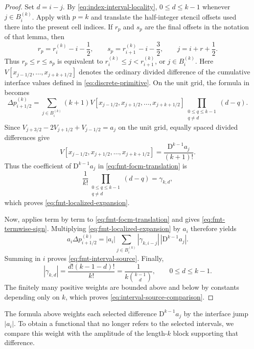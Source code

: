 \documentclass[11pt]{amsart}
\theoremstyle{plain}
\theoremstyle{definition}
\theoremstyle{remark}
\numberwithin{equation}{section}
\theoremstyle{plain}
\begin{document}
\begin{proof}
	Set $d=i-j$.  By \eqref{eq:index-interval-locality}, $0\le d\le k-1$
	whenever $j\in B_i^{(k)}$.  Apply \cite[Lemma~2.1]{FMT} with $p=k$ and
	translate the half-integer stencil offsets used there into the present
	cell indices.  If $r_p$ and $s_p$ are the final offsets in the notation of that
	lemma, then
	\[
		r_p=r_i^{(k)}-i-\frac12,
		\qquad
		s_p=r_{i+1}^{(k)}-i-\frac32,
		\qquad
		j=i+r+\frac12.
	\]
	Thus $r_p\le r\le s_p$ is equivalent to
	$r_i^{(k)}\le j<r_{i+1}^{(k)}$, or $j\in B_i^{(k)}$.  Here
	$V[x_{j-1/2},\ldots,x_{j+k+1/2}]$ denotes the ordinary divided difference
	of the cumulative interface values defined in \eqref{eq:discrete-primitive}.
	On the unit grid, the formula in \cite[Lemma~2.1]{FMT} becomes
	\begin{equation}\label{eq:fmt-focm-translation}
		\Delta p_{i+1/2}^{(k)}
		=
		\sum_{j\in B_i^{(k)}}
		(k+1)
		V[x_{j-1/2},x_{j+1/2},\ldots,x_{j+k+1/2}]
		\prod_{\substack{0\le q\le k-1\\q\ne d}}(d-q).
	\end{equation}
	Since
	$V_{j+3/2}-2V_{j+1/2}+V_{j-1/2}=a_j$ on the unit grid, equally spaced
	divided differences give
	\[
	V[x_{j-1/2},x_{j+1/2},\ldots,x_{j+k+1/2}]
	=\frac{\mathrm D^{k-1}a_j}{(k+1)!}.
	\]
	Thus the coefficient of $\mathrm D^{k-1}a_j$ in
	\eqref{eq:fmt-focm-translation} is
	\[
		\frac1{k!}\prod_{\substack{0\le q\le k-1\\q\ne d}}(d-q)
		=\gamma_{k,d},
	\]
	which proves \eqref{eq:fmt-localized-expansion}.

	Now, \cite[Lemma~2.2]{FMT} applies term by term to
	\eqref{eq:fmt-focm-translation} and gives
	\eqref{eq:fmt-termwise-sign}.  Multiplying
	\eqref{eq:fmt-localized-expansion} by $a_i$ therefore yields
	\[
		a_i\Delta p_{i+1/2}^{(k)}
		=|a_i|\sum_{j\in B_i^{(k)}}
		|\gamma_{k,i-j}|\,|\mathrm D^{k-1}a_j|.
	\]
	Summing in $i$ proves \eqref{eq:fmt-interval-source}.  Finally,
	\[
		|\gamma_{k,d}|
		=\frac{d!(k-1-d)!}{k!}
		=\frac1{k\binom{k-1}{d}},
		\qquad 0\le d\le k-1.
	\]
	The finitely many positive weights are bounded above and below by constants
	depending only on $k$, which proves
	\eqref{eq:interval-source-comparison}.
\end{proof}


The formula above weights each selected difference
$\mathrm D^{k-1}a_j$ by the interface jump $|a_i|$.
To obtain a functional that no longer refers to the selected intervals,
we compare this weight with the amplitude of the length-$k$ block supporting
that difference.
\end{document}

